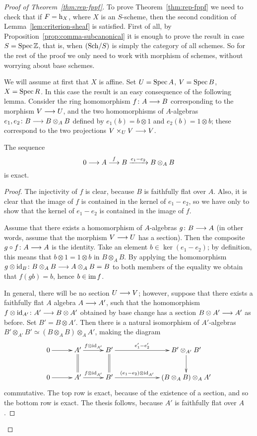 \begin{2   CONTRAVARIANT FUNCTORS}
\begin{2.3 Sheaves in Grothendieck topologies}
\begin{proof}[Proof of Theorem~\ref{thm:rep-fppf}]
To prove Theorem~\ref{thm:rep-fppf} we need to check that if $F = \mathrm{h}_X$, where $X$ is an $S$-scheme, then the second condition of Lemma~\ref{lem:criterion-sheaf} is satisfied. First of all, by Proposition~\ref{prop:comma-subcanonical} it is enough to prove the result in case $S = \operatorname{Spec} \mathbb{Z}$, that is, when $({\mathrm{Sch}/S})$ is simply the category of all schemes. So for the rest of the proof we only need to work with morphism of schemes, without worrying about base schemes.

We will assume at first that $X$ is affine. Set $U = \operatorname{Spec} A$, $V = \operatorname{Spec} B$, $X = \operatorname{Spec} R$. In this case the result is an easy consequence of the following lemma. Consider the ring homomorphism $f \colon A \arr B$ corresponding to the morphism $V \arr U$, and the two homomorphisms of $A$-algebras $e_1, e_2\colon B \arr B \otimes_A B$ defined by $e_1(b) = b \otimes 1$ and $e_2(b) = 1 \otimes b$; these correspond to the two projections $V \times_U V \arr V$.

\begin{lemma}\label{lem:exact-affine}
The sequence
   \[
   0 \arr A \overset{f}\larr B
   \xrightarrow{e_1 - e_2} B \otimes_A B
   \]
is exact.
\end{lemma}
\begin{proof}

The injectivity of $f$ is clear, because $B$ is faithfully flat over $A$. Also, it is clear that the image of $f$ is contained in the kernel of $e_1 - e_2$, so we have only to show that the kernel of $e_1 - e_2$ is contained in the image of $f$.

Assume that there exists a homomorphism of $A$-algebras $g \colon B \arr A$ (in other words, assume that the morphism $V \arr U$ has a section). Then the composite $g \circ f \colon A\arr A$ is the identity. Take an element $b \in \ker (e_1 - e_2)$; by definition, this means that $b \otimes 1 = 1 \otimes b$ in $B \otimes_A B$. By applying the homomorphism $g \otimes \id_B \colon B \otimes_A B \arr A \otimes_A B = B$ to both members of the equality we obtain that $f(g b) = b$, hence $b \in \operatorname{im} f$.

In general, there will be no section $U \arr V$; however, suppose that there exists a faithfully flat $A$ algebra $A \arr A'$, such that the homomorphism $f \otimes \id_{A'} \colon A' \arr B \otimes A'$ obtained by base change has a section $B \otimes A' \arr A'$ as before. Set $B' = B \otimes A'$. Then there is a natural isomorphism of $A'$-algebras $B' \otimes_{A'} B' \simeq (B \otimes_A B) \otimes_A A'$, making the diagram
   \[
   \xymatrix@C+5pt{
   0\ar[r] & A'\ar[r]^-{f \otimes \id_{A'}}\ar@{=}[d]
   &B'\ar@{=}[d]\ar[rr]^-{e'_1 - e'_2}
   && B' \otimes_{A'} B'\ar[d]\\
   0\ar[r] & A'\ar[r]^-{f \otimes \id_{A'}}
   &B'\ar[rr]^-{(e_1 - e_2) \otimes \id_{A'}}
   && (B \otimes_A B) \otimes_A A'
   }
   \]
commutative. The top row is exact, because of the existence of a section, and so the bottom row is exact. The thesis follows, because $A'$ is faithfully flat over $A$.


\end{proof}
\end{proof}
\end{2.3 Sheaves in Grothendieck topologies}
\end{2   CONTRAVARIANT FUNCTORS}

